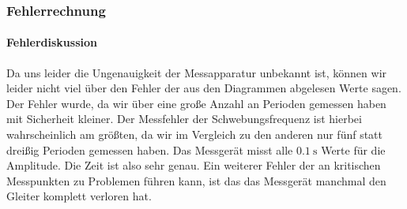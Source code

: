 \documentclass{article}
\begin{document}

          \subsubsection{Fehlerrechnung}

              \paragraph{Fehlerdiskussion}
                  Da uns leider die Ungenauigkeit der Messapparatur unbekannt ist, können wir leider nicht viel über den Fehler der aus den Diagrammen abgelesen Werte sagen.
                  Der Fehler wurde, da wir über eine große Anzahl an Perioden gemessen haben mit Sicherheit kleiner.
                  Der Messfehler der Schwebungsfrequenz ist hierbei wahrscheinlich am größten, da wir im Vergleich zu den anderen nur fünf statt dreißig Perioden gemessen haben.
                  Das Messgerät misst alle \(\SI{0.1}{\second}\) Werte für die Amplitude. Die Zeit ist also sehr genau.
                  Ein weiterer Fehler der an kritischen Messpunkten zu Problemen führen kann, ist das das Messgerät manchmal den Gleiter komplett verloren hat.
\end{document}
